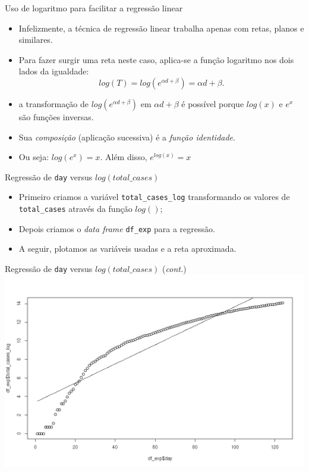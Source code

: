 \documentclass[a4paper,10pt]{beamer}
\begin{document}
\begin{frame}{Uso de logaritmo para facilitar a regressão linear}
  \begin{itemize}
      \item Infelizmente, a técnica de regressão linear trabalha apenas com
	  retas, planos e similares.
      \item Para fazer surgir uma reta neste caso, aplica-se a função 
	  logaritmo nos dois lados da igualdade:
	  \begin{equation*}
	      log(T) = log(e^{\alpha d + \beta}) = \alpha d + \beta.
	  \end{equation*}

      \item a transformação de $log(e^{\alpha d + \beta})$ em $\alpha d + \beta$
	  é possível porque $log(x)$ e $e^x$ são funções inversas.
      \item Sua {\em composição} (aplicação sucessiva) é a 
	  {\em função identidade}.
      \item Ou seja: $log(e^x) = x$. Além disso, $e^{log(x)} = x$
  \end{itemize}

\end{frame}

\begin{frame}{ Regressão de {\tt day} versus $log(total\_cases)$}
  
  
  \begin{itemize}
      \item Primeiro criamos a variável {\tt total\_cases\_log} transformando 
	  os valores de {\tt total\_cases} através da função $log()$;
      \item Depois criamos o {\em data frame} {\tt df\_exp} para a regressão.
      \item A seguir, plotamos as variáveis usadas e a reta aproximada.
  \end{itemize}

\end{frame}

\begin{frame}{ Regressão de {\tt day} versus $log(total\_cases)$
    ({\em cont.})}
  \includegraphics[scale=0.375]{plot-exp.png}
\end{frame}
\end{document}
